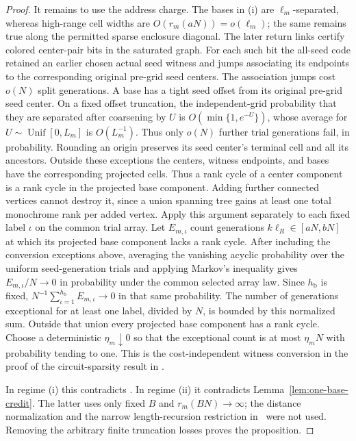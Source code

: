 \begin{proof}
It remains to use the address charge.  The bases in (i) are
\(\ell_m\)-separated, whereas high-range cell widths are
\(O(r_m(aN))=o(\ell_m)\); the same remains true along the
permitted sparse enclosure diagonal.  The later return links
certify colored center-pair bits in the saturated graph.  For each
such bit the all-seed code retained an earlier chosen actual seed
witness and jumps associating its endpoints to the corresponding
original pre-grid seed centers.  The association jumps cost \(o(N)\)
split generations.  A base has a tight seed offset from its
original pre-grid seed center.  On a fixed offset truncation, the independent-grid
probability that they are separated after coarsening by \(U\)
is \(O(\min\{1,e^{-U}\})\), whose average for
\(U\sim\operatorname{Unif}[0,L_m]\) is \(O(L_m^{-1})\).
Thus only \(o(N)\) further trial generations fail, in probability.
Rounding an origin preserves its seed center's terminal cell and all its ancestors.
Outside these exceptions the centers, witness endpoints, and
bases have the corresponding projected cells.
Thus a rank cycle of a center component is a rank cycle in the
projected base component.  Adding further connected vertices
cannot destroy it, since a union spanning tree gains at least
one total monochrome rank per added vertex.  Apply this argument
separately to each fixed label \(\iota\) on the common trial array.
Let \(E_{m,\iota}\) count generations
\(k\ell_R\in[aN,bN]\) at which its projected base component lacks a
rank cycle.  After including the conversion exceptions above, averaging
the vanishing acyclic probability over the uniform seed-generation
trials and applying Markov's inequality gives
\(E_{m,\iota}/N\to0\) in probability under the common selected array
law.  Since \(h_{\mathrm b}\) is fixed,
\(N^{-1}\sum_{\iota=1}^{h_{\mathrm b}}E_{m,\iota}\to0\) in that same
probability.  The number of generations exceptional for at least one
label, divided by \(N\), is bounded by this normalized sum.  Outside
that union every projected base component has a rank cycle.
Choose a deterministic
\(\eta_m\downarrow0\) so that the exceptional count is at most
\(\eta_mN\) with probability tending to one.  This is the cost-independent
witness conversion in the proof of the circuit-sparsity result
in \cite[Section~12]{P}.

In regime (i) this contradicts
\cite[Proposition~10.18]{P}.  In regime (ii) it contradicts
Lemma~\ref{lem:one-base-credit}.  The latter uses only fixed
\(B\) and \(r_m(BN)\to\infty\); the distance normalization and
the narrow length-recursion restriction in~\cite{P} were not
used.  Removing the arbitrary finite truncation losses proves
the proposition.
\end{proof}

